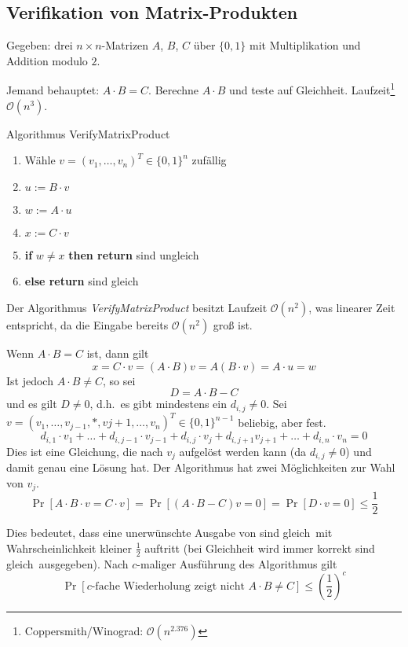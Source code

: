 \subsection{Verifikation von Matrix-Produkten}
Gegeben: drei $n \times n$-Matrizen $A$, $B$, $C$ über $\{0, 1\}$ mit
Multiplikation und Addition modulo $2$.

Jemand behauptet: $A\cdot B = C$. Berechne $A\cdot B$ und teste auf Gleichheit.
Laufzeit\footnote{Coppersmith/Winograd: $\mathcal{O}(n^{2.376})$}
$\mathcal{O}(n^3)$.

\begin{algorithm}
	\caption{Algorithmus VerifyMatrixProduct}
	\vspace{0.4cm}
	\begin{enumerate}
		\setlength{\itemsep}{2pt}
		\setlength{\parskip}{2pt}
		\setlength{\parsep}{2pt}
		\item Wähle $v = \left(v_1, \dots, v_n\right)^T \in \{0, 1\}^n$ zufällig
		\item $u := B\cdot v$
		\item $w := A\cdot u$
		\item $x := C\cdot v$
		\item \textbf{if} $w \not= x$ \textbf{then return} \glqq sind ungleich\grqq
		\item[] \textbf{else return} \glqq sind gleich\grqq
	\end{enumerate}
\end{algorithm}

Der Algorithmus \emph{VerifyMatrixProduct} besitzt Laufzeit $\mathcal{O}(n^2)$,
was linearer Zeit entspricht, da die Eingabe bereits $\mathcal{O}(n^2)$ groß ist.

Wenn $A\cdot B = C$ ist, dann gilt
\[
  x = C \cdot v = \left( A \cdot B \right) v = A \left( B \cdot v \right) = A \cdot u = w
\]
Ist jedoch $A\cdot B \not= C$, so sei
\[
  D = A\cdot B - C
\]
und es gilt $D \not= 0$, d.h.\ es gibt mindestens ein $d_{i,j} \not= 0$. Sei $v
= \left( v_1, \dots, v_{j-1}, \ast, v{j+1}, \dots, v_n \right)^T \in \{0,
1\}^{n-1}$ beliebig, aber fest.
\[
  d_{i,1} \cdot v_1 + \dots + d_{i,j-1} \cdot v_{j-1} + d_{i,j} \cdot v_j +
  d_{i,j+1} v_{j+1} + \dots + d_{i,n} \cdot v_n = 0
\]
Dies ist eine Gleichung, die nach $v_j$ aufgelöst werden kann (da $d_{i,j}
\not= 0$) und damit genau eine Lösung hat. Der Algorithmus hat zwei
Möglichkeiten zur Wahl von $v_j$.
\[
  \Pr\left[ A\cdot B \cdot v = C \cdot v \right] = \Pr\left[ \left(A\cdot B -
  C\right) v = 0 \right] = \Pr\left[ D \cdot v = 0 \right] \leq \frac{1}{2}
\]

Dies bedeutet, dass eine unerwünschte Ausgabe von \glqq sind gleich\grqq\ mit
Wahrscheinlichkeit kleiner $\frac{1}{2}$ auftritt (bei Gleichheit wird immer
korrekt \glqq sind gleich\grqq\ ausgegeben). Nach $c$-maliger Ausführung des
Algorithmus gilt
\[
  \Pr\left[ \text{$c$-fache Wiederholung zeigt nicht $A\cdot B \not= C$}
  \right] \leq \left(\frac{1}{2}\right)^c
\]
